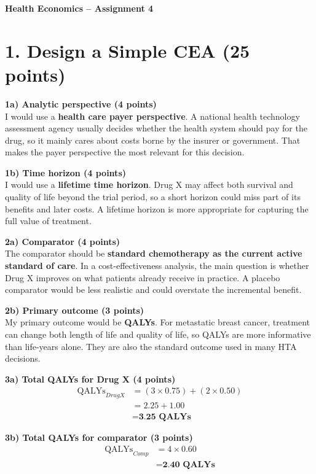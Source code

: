 \documentclass[11pt, letterpaper]{article}
\begin{document}
\begin{center}
    \LARGE\bfseries Health Economics -- Assignment 4
\end{center}
\vspace{1em}

\section*{1. Design a Simple CEA (25 points)}

\textbf{1a) Analytic perspective (4 points)} \\
I would use a \textbf{health care payer perspective}. A national health technology assessment agency usually decides whether the health system should pay for the drug, so it mainly cares about costs borne by the insurer or government. That makes the payer perspective the most relevant for this decision.

\textbf{1b) Time horizon (4 points)} \\
I would use a \textbf{lifetime time horizon}. Drug X may affect both survival and quality of life beyond the trial period, so a short horizon could miss part of its benefits and later costs. A lifetime horizon is more appropriate for capturing the full value of treatment.

\textbf{2a) Comparator (4 points)} \\
The comparator should be \textbf{standard chemotherapy as the current active standard of care}. In a cost-effectiveness analysis, the main question is whether Drug X improves on what patients already receive in practice. A placebo comparator would be less realistic and could overstate the incremental benefit.

\textbf{2b) Primary outcome (3 points)} \\
My primary outcome would be \textbf{QALYs}. For metastatic breast cancer, treatment can change both length of life and quality of life, so QALYs are more informative than life-years alone. They are also the standard outcome used in many HTA decisions.

\textbf{3a) Total QALYs for Drug X (4 points)} \\
\begin{align*}
\text{QALYs}_{Drug X} &= (3 \times 0.75) + (2 \times 0.50) \\
&= 2.25 + 1.00 \\
&= \textbf{3.25 \ QALYs}
\end{align*}

\textbf{3b) Total QALYs for comparator (3 points)} \\
\begin{align*}
\text{QALYs}_{Comp} &= 4 \times 0.60 \\
&= \textbf{2.40 \ QALYs}
\end{align*}
\end{document}
